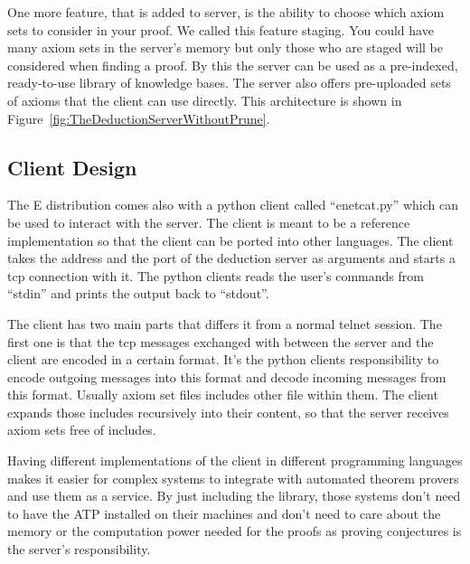 
One more feature, that is added to server, is the ability to choose which axiom sets to consider in your proof. We called this feature staging. You could have many axiom sets in the server's memory but only those who are staged will be considered when finding a proof. By this the server can be used as a pre-indexed, ready-to-use library of knowledge bases. The server also offers pre-uploaded sets of axioms that the client can use directly. This architecture is shown in Figure~\ref{fig:TheDeductionServerWithoutPrune}.


\subsection{Client Design}
The E distribution comes also with a python client called ``enetcat.py'' which can be used to interact with the server. The client is meant to be a reference implementation so that the client can be ported into other languages. The client takes the address and the port of the deduction server as arguments and starts a \ac{tcp} connection with it. The python clients reads the user's commands from ``stdin'' and prints the output back to ``stdout''.

The client has two main parts that differs it from a normal telnet session. The first one is that the \ac{tcp} messages exchanged with between the server and the client are encoded in a certain format. It's the python clients responsibility to encode outgoing messages into this format and decode incoming messages from this format. Usually axiom set files includes other file within them. The client expands those includes recursively into their content, so that the server receives axiom sets free of includes.

Having different implementations of the client in different programming languages makes it easier for complex systems to integrate with automated theorem provers and use them as a service. By just including the library, those systems don't need to have the ATP installed on their machines and don't need to care about the memory or the computation power needed for the proofs as proving conjectures is the server's responsibility.

